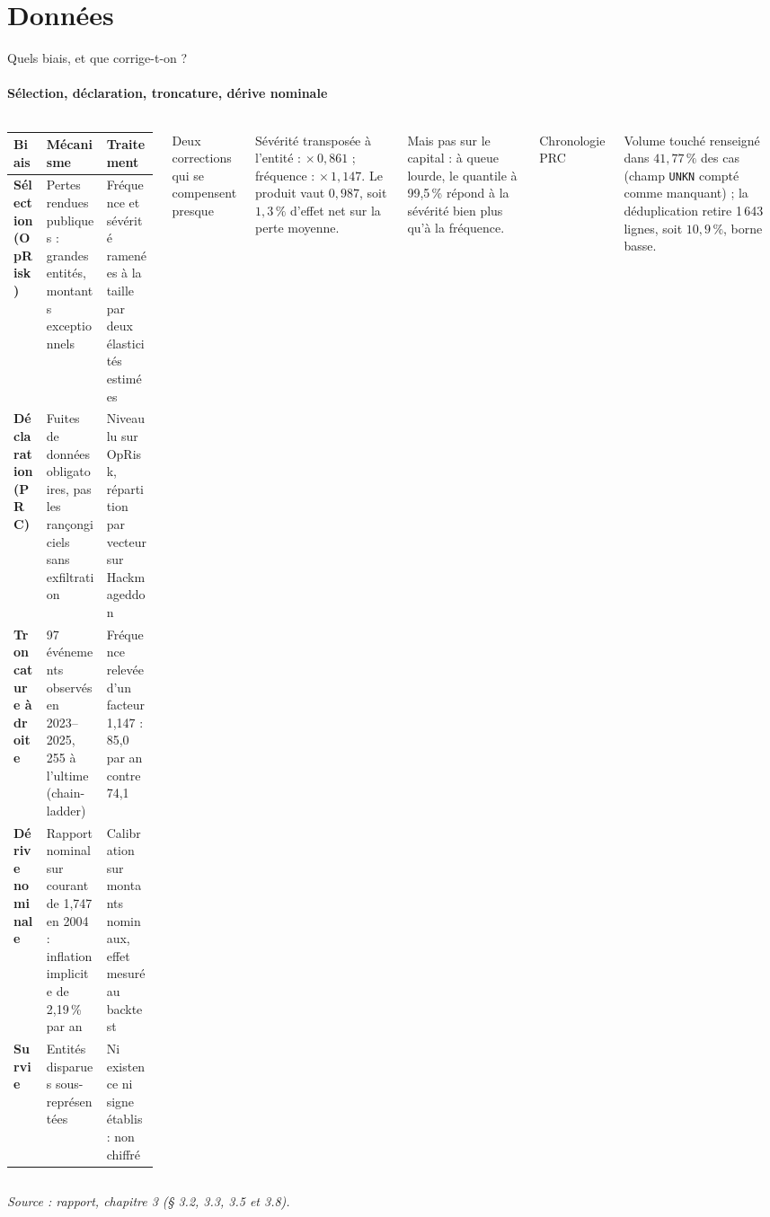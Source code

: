 \documentclass[aspectratio=169,10pt,t]{beamer}
\newcommand{\source}[1]{\par\vfill{\tiny\color{gris}\textit{Source : #1}}\par\vspace{-1mm}}
\renewcommand{\arraystretch}{1.25}
\begin{document}
\section{Données}
\begin{frame}{Quels biais, et que corrige-t-on ?}
  \framesubtitle{\etabli Sélection, déclaration, troncature, dérive nominale}
  \begin{columns}[T,onlytextwidth]
    \scriptsize
    \renewcommand{\arraystretch}{1.12}
    \begin{tabularx}{\linewidth}{@{}>{\bfseries}l Y Y@{}}
      \toprule
      Biais & Mécanisme & Traitement \\
      \midrule
      Sélection (OpRisk) & Pertes rendues publiques : grandes entités, montants exceptionnels & Fréquence et sévérité ramenées à la taille par deux élasticités estimées \\
      Déclaration (PRC) & Fuites de données obligatoires, pas les rançongiciels sans exfiltration & Niveau lu sur OpRisk, répartition par vecteur sur Hackmageddon \\
      Troncature à droite & 97 événements observés en 2023--2025, 255 à l'ultime (chain-ladder) & Fréquence relevée d'un facteur 1,147 : 85,0 par an contre 74,1 \\
      Dérive nominale & Rapport nominal sur courant de 1,747 en 2004 : inflation implicite de 2,19\,\% par an & Calibration sur montants nominaux, effet mesuré au backtest \\
      Survie & Entités disparues sous-représentées & Ni existence ni signe établis : non chiffré \\
      \bottomrule
    \end{tabularx}
    \footnotesize
    {\editorial\normalsize Deux corrections qui se compensent presque}\par\vspace{1.5mm}
    Sévérité transposée à l'entité : $\times\,0{,}861$ ; fréquence : $\times\,1{,}147$. Le produit vaut $0{,}987$, soit $1{,}3\,\%$ d'effet net sur la perte moyenne.\par\vspace{1.5mm}
    {\color{accent}Mais pas sur le capital :} à queue lourde, le quantile à 99,5\,\% répond à la sévérité bien plus qu'à la fréquence.\par\vspace{3mm}
    {\editorial\normalsize Chronologie PRC}\par\vspace{1.5mm}
    Volume touché renseigné dans $41{,}77\,\%$ des cas (champ \texttt{UNKN} compté comme manquant) ; la déduplication retire 1\,643 lignes, soit $10{,}9\,\%$, borne basse.
  \end{columns}
  \source{rapport, chapitre 3 (§ 3.2, 3.3, 3.5 et 3.8).}
\end{frame}
\end{document}
